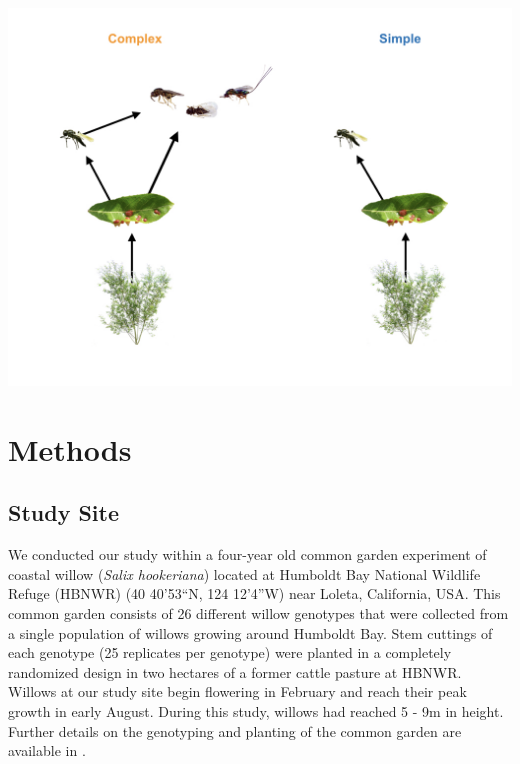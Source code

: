 \documentclass[11pt,]{article}
\let\origfigure\figure
\let\endorigfigure\endfigure
\renewenvironment{figure}[1][2] {
    \expandafter\origfigure\expandafter[H]
} {
    \endorigfigure
}
\begin{document}
\begin{figure}
\centering
\includegraphics{analyses/complex_simple_foodwebs_v2.jpeg}
\caption{\label{fig:Conceptual}Experimental manipulation of food-web
complexity associated with a leaf-galling midge (\emph{Iteomyia
salicisverruca}) feeding on the willow \emph{Salix hookeriana}. Black
arrows denote the flow of energy in this network of trophic
interactions. In the complex food-web treatment, we allowed the full
suite of egg and larval parasitoids to impose selection. In the simple
food-web treatment, we used mesh bags to exclude the guild of larval
parasitoids, only allowing the egg parasitoid (\emph{Platygaster} sp.)
to impose selection. Larval parasitoids include the following species
(from left to right): \emph{Mesopolobus} sp. (Family: Pteromalidae);
\emph{Tetrastichus} sp. (Family: Eulophidae); and \emph{Torymus} sp.
(Family: Torymidae).}
\end{figure}

\section{Methods}\label{methods}

\subsection{Study Site}\label{study-site}

We conducted our study within a four-year old common garden experiment
of coastal willow (\emph{Salix hookeriana}) located at Humboldt Bay
National Wildlife Refuge (HBNWR) (40 40'53``N, 124 12'4''W) near Loleta,
California, USA. This common garden consists of 26 different willow
genotypes that were collected from a single population of willows
growing around Humboldt Bay. Stem cuttings of each genotype (25
replicates per genotype) were planted in a completely randomized design
in two hectares of a former cattle pasture at HBNWR. Willows at our
study site begin flowering in February and reach their peak growth in
early August. During this study, willows had reached 5 - 9m in height.
Further details on the genotyping and planting of the common garden are
available in \citet{Barbour2015}.
\end{document}
